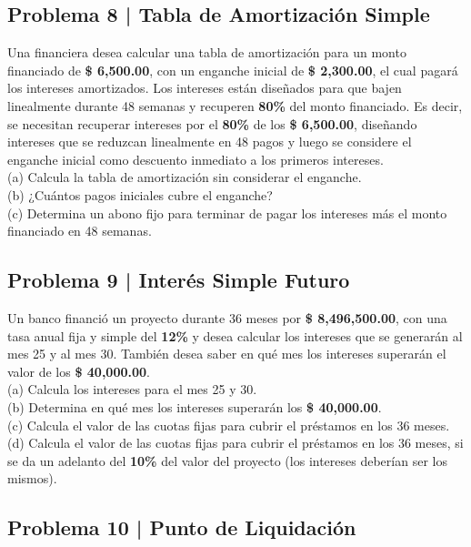 \documentclass{article}
\begin{document}
\clearpage

\subsection*{Problema 8 | Tabla de Amortización Simple}

Una financiera desea calcular una tabla de amortización para un monto financiado de \textbf{\$ 6,500.00}, con un enganche inicial de \textbf{\$ 2,300.00}, el cual pagará los intereses amortizados. Los intereses están diseñados para que bajen linealmente durante 48 semanas y recuperen \textbf{80\%} del monto financiado. Es decir, se necesitan recuperar intereses por el \textbf{80\%} de los \textbf{\$ 6,500.00}, diseñando intereses que se reduzcan linealmente en 48 pagos y luego se considere el enganche inicial como descuento inmediato a los primeros intereses.
\\[12pt]
(a) Calcula la tabla de amortización sin considerar el enganche.
\\[6pt]
(b) ¿Cuántos pagos iniciales cubre el enganche?
\\[6pt]
(c) Determina un abono fijo para terminar de pagar los intereses más el monto financiado en 48 semanas.

\clearpage

\subsection*{Problema 9 | Interés Simple Futuro}

Un banco financió un proyecto durante 36 meses por \textbf{\$ 8,496,500.00}, con una tasa anual fija y simple del \textbf{12\%} y desea calcular los intereses que se generarán al mes 25 y al mes 30. También desea saber en qué mes los intereses superarán el valor de los \textbf{\$ 40,000.00}.
\\[12pt]
(a) Calcula los intereses para el mes 25 y 30.
\\[6pt]
(b) Determina en qué mes los intereses superarán los \textbf{\$ 40,000.00}.
\\[6pt]
(c) Calcula el valor de las cuotas fijas para cubrir el préstamos en los 36 meses.
\\[6pt]
(d) Calcula el valor de las cuotas fijas para cubrir el préstamos en los 36 meses, si se da un adelanto del \textbf{10\%} del valor del proyecto (los intereses deberían ser los mismos).

\clearpage

\subsection*{Problema 10 | Punto de Liquidación}
\end{document}
